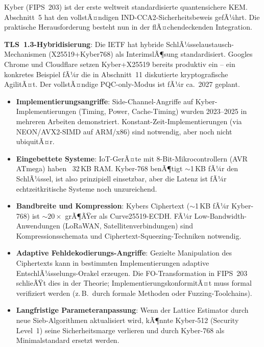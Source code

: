 ﻿\documentclass[a4paper,12pt]{article}
\theoremstyle{definition}
\begin{document}
Kyber (FIPS~203) ist der erste weltweit standardisierte quantensichere
KEM. Abschnitt~5 hat den vollstÃ¤ndigen IND-CCA2-Sicherheitsbeweis
gefÃ¼hrt. Die praktische Herausforderung besteht nun in der
flÃ¤chendeckenden Integration.

\textbf{TLS~1.3-Hybridisierung}: Die IETF hat hybride
SchlÃ¼sselaustausch-Mechanismen (X25519+Kyber768) als InterimslÃ¶sung
standardisiert. Googles Chrome und Cloudflare setzen Kyber+X25519
bereits produktiv ein -- ein konkretes Beispiel fÃ¼r die in Abschnitt~11
diskutierte kryptografische AgilitÃ¤t. Der vollstÃ¤ndige PQC-only-Modus
ist fÃ¼r ca.\ 2027 geplant.

\begin{itemize}
  \item \textbf{Implementierungsangriffe}: Side-Channel-Angriffe auf
    Kyber-Implementierungen (Timing, Power, Cache-Timing) wurden
    2023--2025 in mehreren Arbeiten demonstriert.
    Konstant-Zeit-Implementierungen (via NEON/AVX2-SIMD auf ARM/x86)
    sind notwendig, aber noch nicht ubiquitÃ¤r.
  \item \textbf{Eingebettete Systeme}: IoT-GerÃ¤te mit 8-Bit-Mikro\-controllern
    (AVR ATmega) haben ~32\,KB RAM. Kyber-768 benÃ¶tigt $\sim$1\,KB
    fÃ¼r den SchlÃ¼ssel, ist also prinzipiell einsetzbar, aber die
    Latenz ist fÃ¼r echtzeitkritische Systeme noch unzureichend.
  \item \textbf{Bandbreite und Kompression}: Kybers Ciphertext
    ($\sim$1\,KB fÃ¼r Kyber-768) ist $\sim$$20\times$ grÃ¶ÃŸer als
    Curve25519-ECDH. FÃ¼r Low-Bandwidth-Anwendungen (LoRaWAN,
    Satellitenverbindungen) sind Kompressionsschemata und
    Ciphertext-Squeezing-Tech\-niken notwendig.
  \item \textbf{Adaptive Fehldekodierungs-Angriffe}: Gezielte
    Manipulation des Ciphertexts kann in bestimmten
    Implementierungen adaptive EntschlÃ¼sselungs-Orakel erzeugen.
    Die FO-Transformation in FIPS~203 schlieÃŸt dies in der Theorie;
    ImplementierungskonformitÃ¤t muss formal verifiziert werden
    (z.\,B.\ durch formale Methoden oder Fuzzing-Toolchains).
  \item \textbf{Langfristige Parameteranpassung}: Wenn der Lattice
    Estimator durch neue Sieb-Algorithmen aktualisiert wird,
    kÃ¶nnte Kyber-512 (Security Level~1) seine Sicherheitsmarge
    verlieren und durch Kyber-768 als Minimalstandard ersetzt werden.
\end{itemize}

\end{document}
